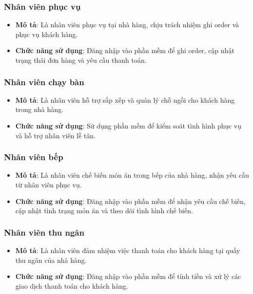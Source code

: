 \subsubsection{Nhân viên phục vụ}
\begin{itemize}[leftmargin=1.5cm, label={--}]
    \item \textbf{Mô tả}: Là nhân viên phục vụ tại nhà hàng, chịu trách nhiệm ghi order và phục vụ khách hàng.
    \item \textbf{Chức năng sử dụng}: Đăng nhập vào phần mềm để ghi order, cập nhật trạng thái đơn hàng và yêu cầu thanh toán.
\end{itemize}

\subsubsection{Nhân viên chạy bàn}
\begin{itemize}[leftmargin=1.5cm, label={--}]
    \item \textbf{Mô tả}: Là nhân viên hỗ trợ sắp xếp và quản lý chỗ ngồi cho khách hàng trong nhà hàng.
    \item \textbf{Chức năng sử dụng}: Sử dụng phần mềm để kiểm soát tình hình phục vụ và hỗ trợ nhân viên lễ tân.
\end{itemize}

\subsubsection{Nhân viên bếp}
\begin{itemize}[leftmargin=1.5cm, label={--}]
    \item \textbf{Mô tả}: Là nhân viên chế biến món ăn trong bếp của nhà hàng, nhận yêu cầu từ nhân viên phục vụ.
    \item \textbf{Chức năng sử dụng}: Đăng nhập vào phần mềm để nhận yêu cầu chế biến, cập nhật tình trạng món ăn và theo dõi tình hình chế biến.
\end{itemize}

\subsubsection{Nhân viên thu ngân}
\begin{itemize}[leftmargin=1.5cm, label={--}]
    \item \textbf{Mô tả}: Là nhân viên đảm nhiệm việc thanh toán cho khách hàng tại quầy thu ngân của nhà hàng.
    \item \textbf{Chức năng sử dụng}: Đăng nhập vào phần mềm để tính tiền và xử lý các giao dịch thanh toán cho khách hàng.
\end{itemize}

